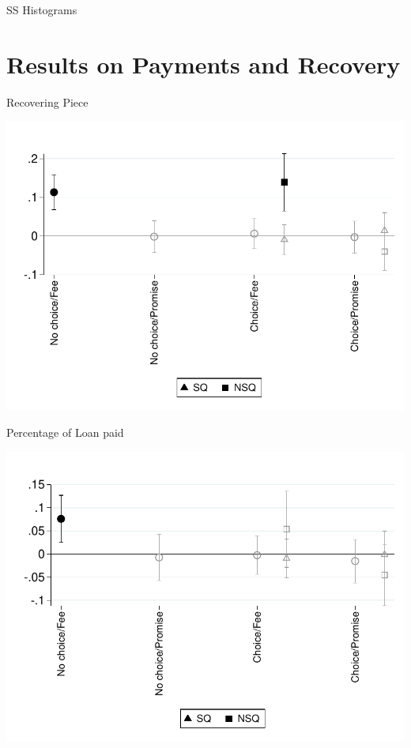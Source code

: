 \documentclass[9pt]{beamer}
\begin{document}
\begin{frame}{SS Histograms}
\end{frame}





\section{Results on Payments and Recovery}



\begin{frame}{Recovering Piece}

    \begin{center}
        \includegraphics[width=.70\textwidth]{Figuras/te_graph_des_c.pdf}
    \end{center}
\end{frame}




\begin{frame}{Percentage of Loan paid}
    \begin{center}
        \includegraphics[width=.70\textwidth]{Figuras/te_graph_sum_porcp_c.pdf}
    \end{center}
\end{frame}
\end{document}

